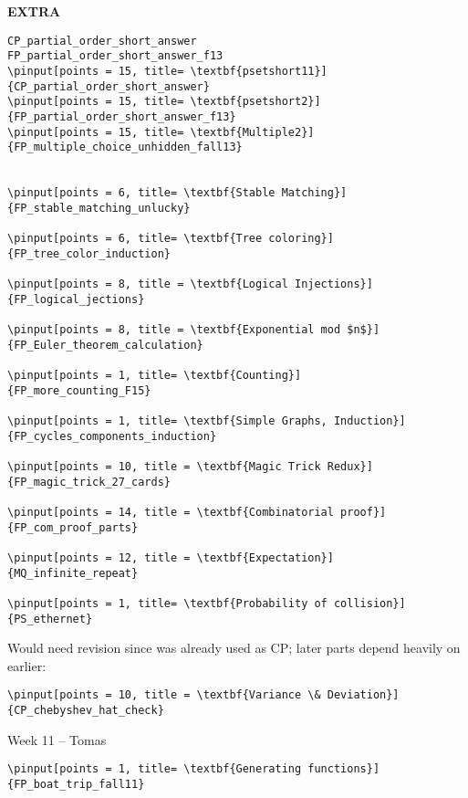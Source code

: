 \documentclass[quiz]{mcs}
\begin{document}
\begin{staffnotes}
\textbf{EXTRA}

\begin{verbatim}
CP_partial_order_short_answer
FP_partial_order_short_answer_f13
\pinput[points = 15, title= \textbf{psetshort11}]{CP_partial_order_short_answer}
\pinput[points = 15, title= \textbf{psetshort2}]{FP_partial_order_short_answer_f13}
\pinput[points = 15, title= \textbf{Multiple2}]{FP_multiple_choice_unhidden_fall13}


\pinput[points = 6, title= \textbf{Stable Matching}]
{FP_stable_matching_unlucky}

\pinput[points = 6, title= \textbf{Tree coloring}]
{FP_tree_color_induction}

\pinput[points = 8, title = \textbf{Logical Injections}]
{FP_logical_jections}

\pinput[points = 8, title = \textbf{Exponential mod $n$}]
{FP_Euler_theorem_calculation}

\pinput[points = 1, title= \textbf{Counting}]
{FP_more_counting_F15}

\pinput[points = 1, title= \textbf{Simple Graphs, Induction}]
{FP_cycles_components_induction}

\pinput[points = 10, title = \textbf{Magic Trick Redux}]
{FP_magic_trick_27_cards}

\pinput[points = 14, title = \textbf{Combinatorial proof}]
{FP_com_proof_parts}

\pinput[points = 12, title = \textbf{Expectation}]
{MQ_infinite_repeat}

\pinput[points = 1, title= \textbf{Probability of collision}]
{PS_ethernet}
\end{verbatim}

Would need revision since was already used as CP;
later parts depend heavily on earlier:

\begin{verbatim}
\pinput[points = 10, title = \textbf{Variance \& Deviation}]
{CP_chebyshev_hat_check}
\end{verbatim}

\begin{center}
{\large Week 11 -- Tomas}
\end{center}

\begin{verbatim}
\pinput[points = 1, title= \textbf{Generating functions}]
{FP_boat_trip_fall11}

\end{verbatim}


\end{staffnotes}
\end{document}
